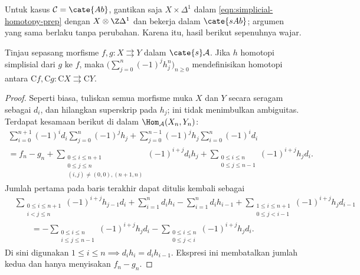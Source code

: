 Untuk kasus $\mathcal{C}=\cate{Ab}$, gantikan saja
$X\times\Delta^1$ dalam \eqref{eqn:simplicial-homotopy-prep} dengan
$X\otimes\Z\Delta^1$ dan bekerja dalam $\cate{sAb}$; argumen yang sama
berlaku tanpa perubahan. Karena itu, hasil berikut sepenuhnya wajar.

\begin{proposition}
	Tinjau sepasang morfisme $f,g:X\rightrightarrows Y$ dalam
	$\cate{s}\mathcal{A}$. Jika $h$ homotopi simplisial dari $g$ ke $f$, maka
	$\bigl(\sum_{j=0}^n(-1)^jh_j^n\bigr)_{n\geq0}$ mendefinisikan homotopi antara
	$\mathrm{C}f,\mathrm{C}g:\mathrm{C}X\rightrightarrows\mathrm{C}Y$.
\end{proposition}
\begin{proof}
	Seperti biasa, tuliskan semua morfisme muka $X$ dan $Y$ secara seragam
	sebagai $d_i$, dan hilangkan superskrip pada $h_j$; ini tidak menimbulkan
	ambiguitas. Terdapat kesamaan berikut di dalam
	$\Hom_{\mathcal{A}}(X_n,Y_n)$:
	\begin{multline*}
		\sum_{i=0}^{n+1}(-1)^id_i\sum_{j=0}^n(-1)^jh_j
		+\sum_{j=0}^{n-1}(-1)^jh_j\sum_{i=0}^n(-1)^id_i\\
		=f_n-g_n
		+\sum_{\substack{0\leq i\leq n+1\\0\leq j\leq n\\
		(i,j)\neq(0,0),(n+1,n)}}(-1)^{i+j}d_ih_j
		+\sum_{\substack{0\leq i\leq n\\0\leq j\leq n-1}}
		(-1)^{i+j}h_jd_i.
	\end{multline*}
	Jumlah pertama pada baris terakhir dapat ditulis kembali sebagai
	\begin{align*}
		&\sum_{\substack{0\leq i\leq n+1\\i<j\leq n}}
		(-1)^{i+j}h_{j-1}d_i
		+\sum_{i=1}^nd_ih_i-\sum_{i=1}^nd_ih_{i-1}
		+\sum_{\substack{1\leq i\leq n+1\\0\leq j<i-1}}
		(-1)^{i+j}h_jd_{i-1}\\
		&\qquad=-\sum_{\substack{0\leq i\leq n\\i\leq j\leq n-1}}
		(-1)^{i+j}h_jd_i
		-\sum_{\substack{0\leq i\leq n\\0\leq j<i}}
		(-1)^{i+j}h_jd_i.
	\end{align*}
	Di sini digunakan
	$1\leq i\leq n\implies d_ih_i=d_ih_{i-1}$. Ekspresi ini membatalkan
	jumlah kedua dan hanya menyisakan $f_n-g_n$.
\end{proof}

